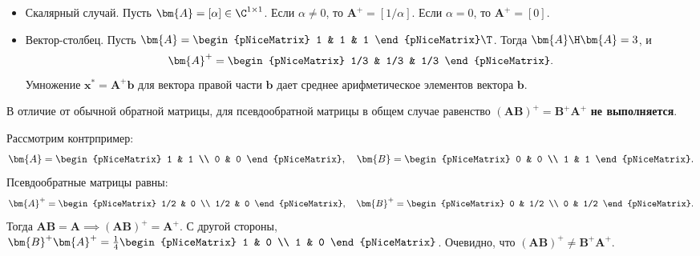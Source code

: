 \begin{tcbexample}
\label{ex:pinv-simple}
    \begin{itemize}
        \item Скалярный случай. Пусть $\bm{A} = [\alpha] \in \C^{1 \times 1}$. Если $\alpha \neq 0$, то $\bm{A}^+ = [1/\alpha]$. Если $\alpha = 0$, то $\bm{A}^+ = [0]$.
        \item Вектор-столбец. Пусть $\bm{A} = \begin{pNiceMatrix} 1 & 1 & 1 \end{pNiceMatrix}\T$. Тогда $\bm{A}\H\bm{A} = 3$, и
        \[
            \bm{A}^+ = \begin{pNiceMatrix} 1/3 & 1/3 & 1/3 \end{pNiceMatrix}.
        \]
        Умножение $\bm{x}^* = \bm{A}^+ \bm{b}$ для вектора правой части $\bm{b}$ дает среднее арифметическое элементов вектора $\bm{b}$.
    \end{itemize}
\end{tcbexample}

\begin{tcbwarning}
\label{warn:ab-pinv}
    В отличие от обычной обратной матрицы, для псевдообратной матрицы в общем случае равенство $(\bm{A}\bm{B})^+ = \bm{B}^+\bm{A}^+$ \textbf{не выполняется}.
    
    Рассмотрим контрпример:
    \[
        \bm{A} = \begin{pNiceMatrix} 1 & 1 \\ 0 & 0 \end{pNiceMatrix}, \quad
        \bm{B} = \begin{pNiceMatrix} 0 & 0 \\ 1 & 1 \end{pNiceMatrix}.
    \]
    Псевдообратные матрицы равны:
    \[
        \bm{A}^+ = \begin{pNiceMatrix} 1/2 & 0 \\ 1/2 & 0 \end{pNiceMatrix}, \quad
        \bm{B}^+ = \begin{pNiceMatrix} 0 & 1/2 \\ 0 & 1/2 \end{pNiceMatrix}.
    \]
    Тогда $\bm{A}\bm{B} = \bm{A} \implies (\bm{A}\bm{B})^+ = \bm{A}^+$. С другой стороны,
    $\bm{B}^+\bm{A}^+ = \frac{1}{4} \begin{pNiceMatrix} 1 & 0 \\ 1 & 0 \end{pNiceMatrix}$. Очевидно, что $(\bm{A}\bm{B})^+ \neq \bm{B}^+\bm{A}^+$.
\end{tcbwarning}

